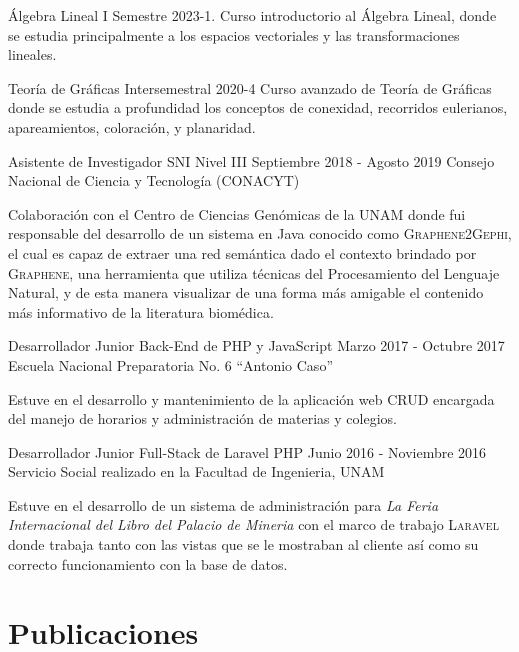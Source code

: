 \documentclass{curriculum-vitae}
\begin{document}
        \course%
            {Álgebra Lineal I}
            {Semestre 2023-1.}
            {Curso introductorio al Álgebra Lineal, donde se estudia
              principalmente a los espacios vectoriales y las transformaciones
              lineales.}

        \course%
            {Teoría de Gráficas}
            {Intersemestral 2020-4}
            {Curso avanzado de Teor\'ia de Gr\'aficas donde se estudia a
              profundidad los conceptos de conexidad, recorridos eulerianos,
              apareamientos, coloración, y planaridad.}

    \experiencesubsection%
      {Asistente de Investigador SNI Nivel III}
      {Septiembre 2018 - Agosto 2019}
      {Consejo Nacional de Ciencia y Tecnología (CONACYT)}

      Colaboración con el Centro de Ciencias Genómicas de la UNAM donde fui
      responsable del desarrollo de un sistema en Java conocido como
      \textsc{Graphene2Gephi}, el cual es capaz de extraer una red semántica
      dado el contexto brindado por \textsc{Graphene}, una herramienta que
      utiliza técnicas del Procesamiento del Lenguaje Natural, y de esta manera
      visualizar de una forma más amigable el contenido más informativo de la
      literatura biomédica.

    \experiencesubsection%
      {Desarrollador Junior Back-End de PHP y JavaScript}
      {Marzo 2017 - Octubre 2017}
      {Escuela Nacional Preparatoria No. 6 ``Antonio Caso''}

      Estuve en el desarrollo y mantenimiento de la aplicación web CRUD
      encargada del manejo de horarios y administración de materias y colegios.

    \experiencesubsection%
      {Desarrollador Junior Full-Stack de Laravel PHP}
      {Junio 2016 - Noviembre 2016}
      {Servicio Social realizado en la Facultad de Ingenieria, UNAM}

      Estuve en el desarrollo de un sistema de administración para \textit{La
        Feria Internacional del Libro del Palacio de Mineria} con el marco de
      trabajo \textsc{Laravel} donde trabaja tanto con las vistas que se le
      mostraban al cliente así como su correcto funcionamiento con la base de
      datos.

  \section{Publicaciones}

    \subsection{}
\end{document}
